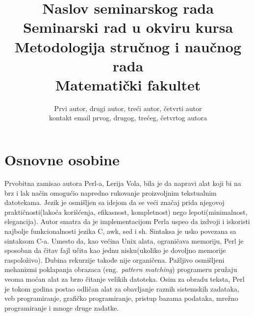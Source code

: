 \documentclass[a4paper]{article}
\begin{document}
\title{Naslov seminarskog rada\\ \small{Seminarski rad u okviru kursa\\Metodologija stručnog i naučnog rada\\ Matematički fakultet}}

\author{Prvi autor, drugi autor, treći autor, četvrti autor\\ kontakt email prvog, drugog, trećeg, četvrtog autora}


\maketitle


\tableofcontents

\newpage

\section{Osnovne osobine}
\label{sec:osobine}

Prvobitna zamisao autora Perl-a, Lerija Vola, bila je da napravi alat koji bi na brz i lak način omogućio napredno rukovanje proizvoljnim tekstualnim datotekama. Jezik je osmišljen sa idejom da se veći značaj prida njegovoj praktičnosti(lakoća korišćenja, efikasnost, kompletnost) nego lepoti(minimalnost, elegancija). Autor smatra da je implementacijom Perla uspeo da izdvoji i iskoristi najbolje funkcionalnosti jezika C, awk, sed i sh\cite{wallperl}. Sintaksa je usko povezana sa sintaksom C-a. Umesto da, kao većina Unix alata, ograničava memoriju, Perl je sposoban da čitav fajl učita kao jednu nisku(ukoliko je dovoljno memorije raspoloživo). Dubina rekurzije takođe nije organičena. Pažljivo osmišljeni mehanizmi poklapanja obrazaca (eng.~{\em pattern matching}) programeru pružaju veoma moćan alat za brzo čitanje velikih datoteka.
Osim za obradu teksta, Perl je tokom godina postao odličan alat za obavljanje raznih sistemskih zadataka, veb programiranje, grafičko programiranje, pristup bazama podataka, mrežno programiranje i mnoge druge zadatke. \\ 
\end{document}
